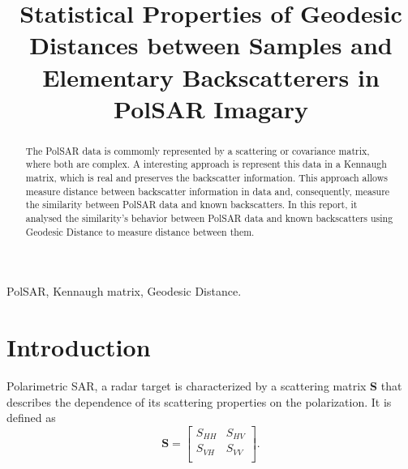 \documentclass[conference]{IEEEtran}
\begin{document}
\title{Statistical Properties of Geodesic Distances between Samples and Elementary Backscatterers in PolSAR Imagary\\
}

\author{
\and
{}
}

\maketitle

\begin{abstract}
The PolSAR data is commomly represented by a scattering or covariance matrix, where both are complex. A interesting approach is represent this data in a Kennaugh matrix, which is real and preserves the backscatter information.
This approach allows measure distance between backscatter information in data and, consequently, measure the similarity between PolSAR data and known backscatters.
In this report, it analysed the similarity's behavior between PolSAR data and known backscatters using Geodesic Distance to measure distance between them.
\end{abstract}

\begin{IEEEkeywords}
PolSAR, Kennaugh matrix, Geodesic Distance.
\end{IEEEkeywords}

\section{Introduction}
 Polarimetric SAR, a radar target is characterized by a scattering matrix \textbf{S} that describes the dependence of its scattering properties on the polarization. It is defined as
\[\textbf{S} = 
\begin{bmatrix}
S_{HH} & S_{HV}\\
S_{VH} & S_{VV}\\
\end{bmatrix}
.\]
\end{document}
